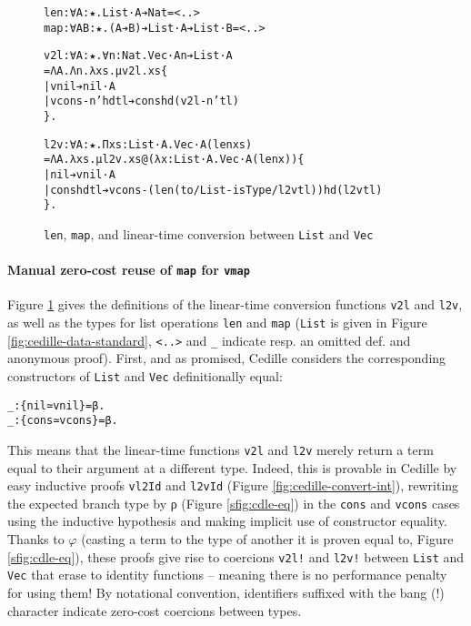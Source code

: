 \documentclass{article}
\begin{document}
\begin{figure}[h]
\begin{alltt}
len: ∀ A: ★. List ·A ➔ Nat = <..>
map: ∀ A B: ★. (A ➔ B) ➔ List ·A ➔ List ·B = <..>

v2l: ∀ A: ★. ∀ n: Nat. Vec ·A n ➔ List ·A
  = Λ A. Λ n. λ xs. μ v2l. xs \{
  | vnil ➔ nil ·A
  | vcons -n' hd tl ➔ cons hd (v2l -n' tl)
  \}.

l2v: ∀ A: ★. Π xs: List ·A. Vec ·A (len xs)
  = Λ A. λ xs. μ l2v. xs @(λ x: List ·A. Vec ·A (len x)) \{
  | nil ➔ vnil ·A
  | cons hd tl ➔ vcons -(len (to/List -isType/l2v tl)) hd (l2v tl)
  \}.
\end{alltt}
  \caption{\texttt{len}, \texttt{map}, and linear-time conversion between
    \texttt{List} and \texttt{Vec}}
  \label{fig:cedille-list}
\end{figure}

\paragraph{\textbf{Manual zero-cost reuse of \texttt{map} for \texttt{vmap}}}
Figure \ref{fig:cedille-list} gives the definitions of the linear-time
conversion functions \texttt{v2l} and \texttt{l2v}, as well as the types for
list operations \texttt{len} and \texttt{map} (\texttt{List} is given in Figure
\ref{fig:cedille-data-standard}, \texttt{<..>} and \texttt{\_} indicate resp.
an omitted def. and anonymous proof). First, and as promised, Cedille
considers the corresponding constructors of \texttt{List} and \texttt{Vec}
definitionally equal: 
{
\begin{alltt}
_ : \{nil  ≃ vnil\}  = β.
_ : \{cons ≃ vcons\} = β.
\end{alltt}
}%
This means that the linear-time functions \texttt{v2l} and \texttt{l2v} merely
return a term equal to their argument at a different type. Indeed, this is
provable in Cedille by easy inductive proofs \texttt{vl2Id} and \texttt{l2vId}
(Figure \ref{fig:cedille-convert-int}), rewriting the expected branch type by ρ
(Figure \ref{sfig:cdle-eq}) in the \texttt{cons} and \texttt{vcons} cases using
the inductive hypothesis and making implicit use of constructor equality. Thanks
to $\varphi$ (casting a term to the type of another it is proven equal to, Figure
\ref{sfig:cdle-eq}), these proofs give rise to coercions \texttt{v2l!} and
\texttt{l2v!} between \texttt{List} and \texttt{Vec} that erase to identity
functions -- meaning there is no performance penalty for using them! By
notational convention, identifiers suffixed with the bang (!) character indicate
zero-cost coercions between types.
\end{document}

